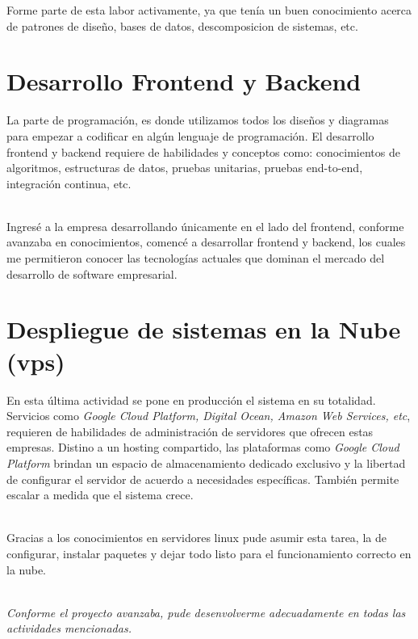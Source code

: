 		Forme parte de esta labor activamente, ya que tenía un buen conocimiento
		acerca de patrones de diseño, bases de datos, descomposicion de sistemas, etc.
		
		
	
	\section{Desarrollo Frontend y Backend}
		La parte de programación, es donde utilizamos todos los diseños y diagramas
		para empezar a codificar en algún lenguaje de programación. El desarrollo
		frontend y backend requiere de habilidades y conceptos como: conocimientos
		de algoritmos, estructuras de datos, pruebas unitarias, pruebas end-to-end, integración
		continua, etc.\\\
		
		Ingresé a la empresa desarrollando únicamente en el lado del frontend,
		conforme avanzaba en conocimientos, comencé a desarrollar frontend y backend,
		los cuales me permitieron conocer las tecnologías actuales que dominan el mercado
		del desarrollo de software empresarial.
		
		
	
	\section{Despliegue de sistemas en la Nube (vps)}	
		En esta última actividad se pone en producción el sistema en su totalidad.
		Servicios como \textit{Google Cloud Platform, Digital Ocean, Amazon Web
		Services, etc}, requieren de habilidades de administración de servidores que
		ofrecen estas empresas. Distino a un hosting compartido, las plataformas como
		\textit{Google Cloud Platform} brindan un espacio de almacenamiento dedicado
		exclusivo y la libertad de configurar el servidor de acuerdo a necesidades
		específicas. También permite escalar a medida que el sistema crece.\\\
		
		Gracias a los conocimientos en servidores linux pude asumir esta tarea, la de
		configurar, instalar paquetes y dejar todo listo para el funcionamiento
		correcto en la nube.\\\
		
		\textit{Conforme el proyecto avanzaba, pude desenvolverme adecuadamente en
		todas las actividades mencionadas.}
